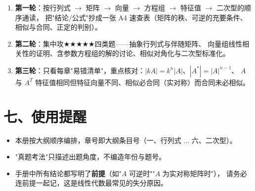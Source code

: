 \begin{enumerate}
  \item \textbf{第一轮}：按行列式 $\to$ 矩阵 $\to$ 向量 $\to$ 方程组 $\to$ 特征值 $\to$ 二次型的顺序通读，
        把"结论/公式"抄成一张 A4 速查表（矩阵的秩、可逆的充要条件、相似与合同、正定的判别）。
  \item \textbf{第二轮}：集中攻$\bigstar\bigstar\bigstar\bigstar\bigstar$四类题——抽象行列式与伴随矩阵、
        向量组线性相关性的证明、含参数方程组的解的讨论、相似对角化与二次型标准化。
  \item \textbf{第三轮}：只看每章"易错清单"，重点核对：$|kA|=k^n|A|$、$|A^*|=|A|^{n-1}$、
        $A$ 与 $A^T$ 特征值相同但特征向量不同、相似必合同（实对称）而合同未必相似。
\end{enumerate}

\section*{七、使用提醒}

\begin{itemize}
  \item 本册按大纲顺序编排，章号即大纲条目号（一、行列式 $\dots$ 六、二次型）。
  \item "真题考法"只描述出题角度，不编造年份与题号。
  \item 手册中所有结论都写明了\textbf{前提}（如"$A$ 可逆时""$A$ 为实对称矩阵时"），
        请务必连前提一起记，这是线性代数最常见的失分原因。
\end{itemize}
